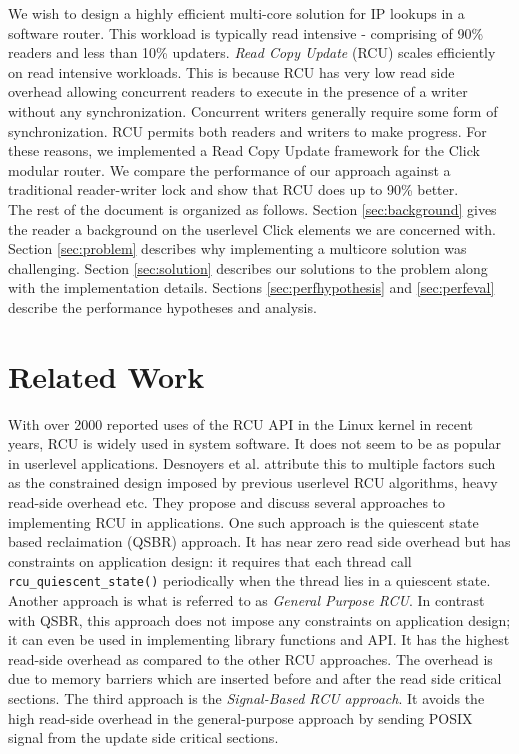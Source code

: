 \documentclass[a4paper,marginparwidth=50pt,marginparsep=10pt]{article}
\begin{document}
We wish to design a highly efficient multi-core solution for IP lookups in a software router. This workload is typically read intensive - comprising of 90\% readers and less than 10\% updaters. \emph{Read Copy Update} (RCU)\cite{readcopyupdate} scales efficiently on read intensive workloads. This is because RCU has very low read side overhead allowing concurrent readers to execute in the presence of a writer without any synchronization. Concurrent writers generally require some form of synchronization. RCU permits both readers and writers to make progress. For these reasons, we implemented a Read Copy Update framework for the Click modular router. We compare the performance of our approach against a traditional reader-writer lock and show that RCU does up to 90\% better.\\

The rest of the document is organized as follows. Section \ref{sec:background} gives the reader a background on the userlevel Click elements we are concerned with. Section \ref{sec:problem} describes why implementing a multicore solution was challenging. Section \ref{sec:solution} describes our solutions to the problem along with the implementation details. Sections \ref{sec:perfhypothesis} and \ref{sec:perfeval} describe the performance hypotheses and analysis.
\section{Related Work}
With over 2000 reported uses of the RCU API \cite{rcuusage} in the Linux kernel in recent years, RCU is widely used in system software. It does not seem to be as popular in userlevel applications. Desnoyers et al. \cite{urcu} attribute this to multiple factors such as the constrained design imposed by previous userlevel RCU algorithms, heavy read-side overhead etc. They propose and discuss several approaches to implementing RCU in applications. One such approach is the quiescent state based reclaimation (QSBR)  approach. It has near zero read side overhead but has constraints on application design: it requires that each thread call \verb+rcu_quiescent_state()+ periodically when the thread lies in a quiescent state. Another approach is what is referred to as \emph{General Purpose RCU}. In contrast with QSBR, this approach does not impose any constraints on application design; it can even be used in implementing library functions and API. It has the highest read-side overhead as compared to the other RCU approaches. The overhead is due to memory barriers which are inserted before and after the read side critical sections. The third approach is the \emph{Signal-Based RCU approach}. It avoids the high read-side overhead in the general-purpose approach by sending POSIX signal from the update side critical sections.
\end{document}
